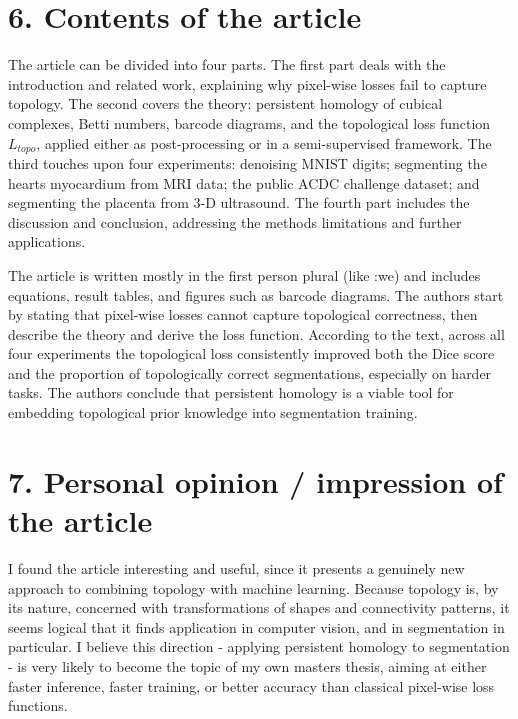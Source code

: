 \documentclass[12pt,a4paper]{article}
\begin{document}
\section*{6. Contents of the article}
    The article can be divided into four parts.
    The first part deals with the introduction and related work,
    explaining why pixel-wise losses fail to capture topology.
    The second covers the theory: persistent homology of cubical
    complexes, Betti numbers, barcode diagrams, and the topological loss
    function $L_{topo}$, applied either as post-processing or in a
    semi-supervised framework.
    The third touches upon four experiments: denoising MNIST digits;
    segmenting the hearts myocardium from MRI data; the public ACDC
    challenge dataset; and segmenting the placenta from 3-D ultrasound.
    The fourth part includes the discussion and conclusion, addressing
    the methods limitations and further applications.

    The article is written mostly in the first person plural (like :we)
    and includes equations, result tables, and figures such as barcode
    diagrams. The authors start by stating that pixel-wise losses cannot
    capture topological correctness, then describe the theory and derive
    the loss function. According to the text, across all four
    experiments the topological loss consistently improved both the
    Dice score and the proportion of topologically correct
    segmentations, especially on harder tasks. The authors conclude
    that persistent homology is a viable tool for embedding topological
    prior knowledge into segmentation training.

\section*{7. Personal opinion / impression of the article}
    I found the article interesting and useful, since it presents a
    genuinely new approach to combining topology with machine learning.
    Because topology is, by its nature, concerned with transformations
    of shapes and connectivity patterns, it seems logical that it finds
    application in computer vision, and in segmentation in particular. I
    believe this direction - applying persistent homology to
    segmentation - is very likely to become the topic of my own
    masters thesis, aiming at either faster inference, faster training,
    or better accuracy than classical pixel-wise loss functions.
\end{document}
